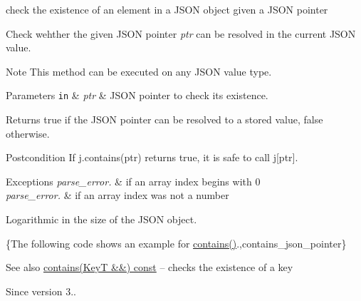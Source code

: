 check the existence of an element in a J\+S\+ON object given a J\+S\+ON pointer 

Check wehther the given J\+S\+ON pointer {\itshape ptr} can be resolved in the current J\+S\+ON value.

\begin{DoxyNote}{Note}
This method can be executed on any J\+S\+ON value type.
\end{DoxyNote}

\begin{DoxyParams}[1]{Parameters}
\mbox{\tt in}  & {\em ptr} & J\+S\+ON pointer to check its existence.\\
\hline
\end{DoxyParams}
\begin{DoxyReturn}{Returns}
true if the J\+S\+ON pointer can be resolved to a stored value, false otherwise.
\end{DoxyReturn}
\begin{DoxyPostcond}{Postcondition}
If {\ttfamily j.\+contains(ptr)} returns true, it is safe to call {\ttfamily j\mbox{[}ptr\mbox{]}}.
\end{DoxyPostcond}

\begin{DoxyExceptions}{Exceptions}
{\em parse\+\_\+error.} & if an array index begins with \textquotesingle{}0\textquotesingle{} \\
\hline
{\em parse\+\_\+error.} & if an array index was not a number\\
\hline
\end{DoxyExceptions}
Logarithmic in the size of the J\+S\+ON object.

\{The following code shows an example for {\ttfamily \hyperlink{classnlohmann_1_1basic__json_aab486f88c1224178ce11503043cf508f}{contains()}}.,contains\+\_\+json\+\_\+pointer\}

\begin{DoxySeeAlso}{See also}
\hyperlink{classnlohmann_1_1basic__json_aab486f88c1224178ce11503043cf508f}{contains(\+Key\+T \&\&) const} -- checks the existence of a key
\end{DoxySeeAlso}
\begin{DoxySince}{Since}
version 3.. 
\end{DoxySince}
